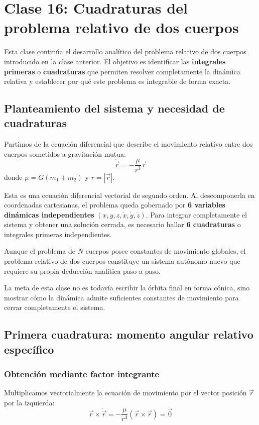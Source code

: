 \chapter{Clase 16: Cuadraturas del problema relativo de dos cuerpos}

Esta clase continúa el desarrollo analítico del problema relativo de dos cuerpos introducido en la clase anterior. El objetivo es identificar las \textbf{integrales primeras} o \textbf{cuadraturas} que permiten resolver completamente la dinámica relativa y establecer por qué este problema es integrable de forma exacta.

\section{Planteamiento del sistema y necesidad de cuadraturas}
Partimos de la ecuación diferencial que describe el movimiento relativo entre dos cuerpos sometidos a gravitación mutua:
\[
\ddot{\vec{r}} = -\frac{\mu}{r^3}\vec{r}
\]
donde \(\mu = G(m_1 + m_2)\) y \(r = |\vec{r}|\).

Esta es una ecuación diferencial vectorial de segundo orden. Al descomponerla en coordenadas cartesianas, el problema queda gobernado por \textbf{6 variables dinámicas independientes} \((x, y, z, \dot{x}, \dot{y}, \dot{z})\). Para integrar completamente el sistema y obtener una solución cerrada, es necesario hallar \textbf{6 cuadraturas} o integrales primeras independientes.

Aunque el problema de \(N\) cuerpos posee constantes de movimiento globales, el problema relativo de dos cuerpos constituye un sistema autónomo nuevo que requiere su propia deducción analítica paso a paso.

\begin{importante}
La meta de esta clase no es todavía escribir la órbita final en forma cónica, sino mostrar cómo la dinámica admite suficientes constantes de movimiento para cerrar completamente el sistema.
\end{importante}

\section{Primera cuadratura: momento angular relativo específico}
\subsection{Obtención mediante factor integrante}
Multiplicamos vectorialmente la ecuación de movimiento por el vector posición \(\vec{r}\) por la izquierda:
\[
\vec{r} \times \ddot{\vec{r}} = -\frac{\mu}{r^3}(\vec{r} \times \vec{r}) = \vec{0}
\]

